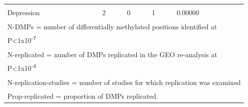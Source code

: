 \documentclass[11pt,oneside]{bristolthesis}
\begin{document}
\begin{table}
{\begin{tabular}[t]{lllll}
\cellcolor{gray!6}{Depression} & \cellcolor{gray!6}{1} & \cellcolor{gray!6}{0} & \cellcolor{gray!6}{1} & \cellcolor{gray!6}{0.00000}\\
Depression & 2 & 0 & 1 & 0.00000\\
\bottomrule
\multicolumn{5}{l}{\textsuperscript{} N-DMPs = number of differentially methylated positions identified at}\\
\multicolumn{5}{l}{P<1x10\textsuperscript{-7}}\\
\multicolumn{5}{l}{\textsuperscript{} N-replicated = number of DMPs replicated in the GEO re-analysis at}\\
\multicolumn{5}{l}{P<1x10\textsuperscript{-4}}\\
\multicolumn{5}{l}{\textsuperscript{} N-replication-studies = number of studies for which replication was examined}\\
\multicolumn{5}{l}{\textsuperscript{} Prop-replicated = proportion of DMPs replicated.}\\
\end{tabular}}
\end{table}
\end{document}
